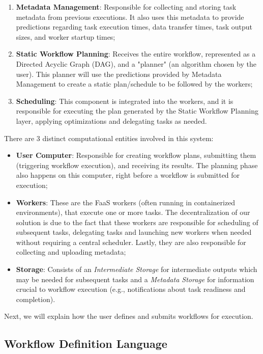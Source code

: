 \documentclass[conference]{IEEEtran}
\begin{document}
\begin{enumerate}
    \item \textbf{Metadata Management}: Responsible for collecting and storing task metadata from previous executions. It also uses this metadata to provide predictions regarding task execution times, data transfer times, task output sizes, and worker startup times;
    \item \textbf{Static Workflow Planning}: Receives the entire workflow, represented as a Directed Acyclic Graph (DAG), and a "planner" (an algorithm chosen by the user). This planner will use the predictions provided by Metadata Management to create a static plan/schedule to be followed by the workers;
    \item \textbf{Scheduling}: This component is integrated into the workers, and it is responsible for executing the plan generated by the Static Workflow Planning layer, applying optimizations and delegating tasks as needed.
\end{enumerate}

There are 3 distinct computational entities involved in this system:

\begin{itemize}
    \item \textbf{User Computer}: Responsible for creating workflow plans, submitting them (triggering workflow execution), and receiving its results. The planning phase also happens on this computer, right before a workflow is submitted for execution;
    \item \textbf{Workers}: These are the FaaS workers (often running in containerized environments), that execute one or more tasks. The decentralization of our solution is due to the fact that these workers are responsible for scheduling of subsequent tasks, delegating tasks and launching new workers when needed without requiring a central scheduler. Lastly, they are also responsible for collecting and uploading metadata;
    \item \textbf{Storage}: Consists of an \textit{Intermediate Storage} for intermediate outputs which may be needed for subsequent tasks and a \textit{Metadata Storage} for information crucial to workflow execution (e.g., notifications about task readiness and completion).
\end{itemize}

Next, we will explain how the user defines and submits workflows for execution.

\subsection{Workflow Definition Language}
\end{document}
